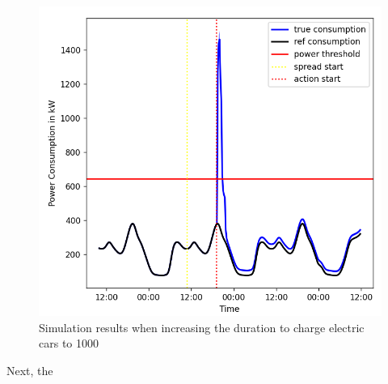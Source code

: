 \begin{figure}[!ht]
    \center
    \includegraphics[scale=.5]{figs/eval/scenario1/longev.png}
    \caption{Simulation results when increasing the duration to 
    charge electric cars to 1000}
    \label{firstscenariobasicevchange}
\end{figure}

Next, the 


